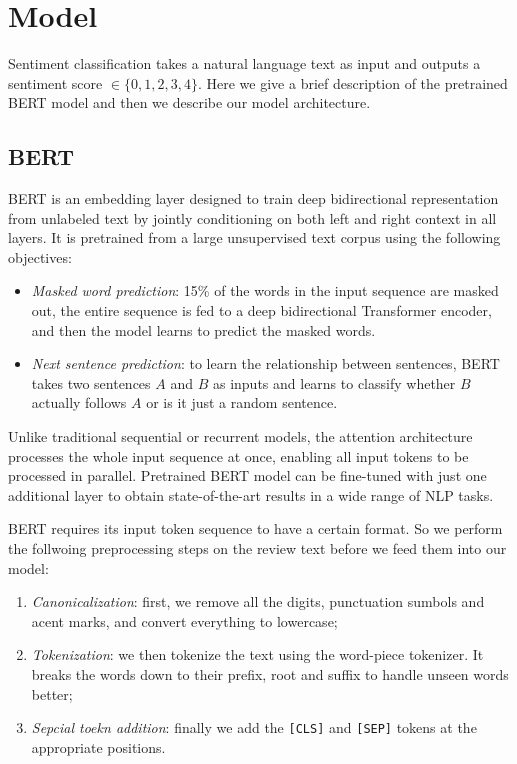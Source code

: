 \section{Model}

Sentiment classification takes a natural language text as input and outputs a
sentiment score $\in \{0, 1, 2, 3, 4\}$. Here we give a brief description of the
pretrained BERT model and then we describe our model architecture.

\subsection{BERT}

BERT is an embedding layer designed to train deep bidirectional representation
from unlabeled text by jointly conditioning on both left and right context in
all layers. It is pretrained from a large unsupervised text corpus using the
following objectives:

\begin{itemize}
    \item \textit{Masked word prediction}: 15\% of the words in the input
    sequence are masked out, the entire sequence is fed to a deep bidirectional
    Transformer encoder, and then the model learns to predict the masked words.

    \item \textit{Next sentence prediction}: to learn the relationship between
    sentences, BERT takes two sentences $A$ and $B$ as inputs and learns to
    classify whether $B$ actually follows $A$ or is it just a random sentence.
\end{itemize}

Unlike traditional sequential or recurrent models, the attention architecture
processes the whole input sequence at once, enabling all input tokens to be
processed in parallel. Pretrained BERT model can be fine-tuned with just one
additional layer to obtain state-of-the-art results in a wide range of NLP
tasks.


BERT requires its input token sequence to have a certain format. So we perform
the follwoing preprocessing steps on the review text before we feed them into
our model:
\begin{enumerate}
    \item \textit{Canonicalization}: first, we remove all the digits,
    punctuation sumbols and acent marks, and convert everything to lowercase;

    \item \textit{Tokenization}: we then tokenize the text using the word-piece
    tokenizer. It breaks the words down to their prefix, root and suffix to
    handle unseen words better;

    \item \textit{Sepcial toekn addition}: finally we add the \texttt{[CLS]} and
    \texttt{[SEP]} tokens at the appropriate positions.
\end{enumerate}

